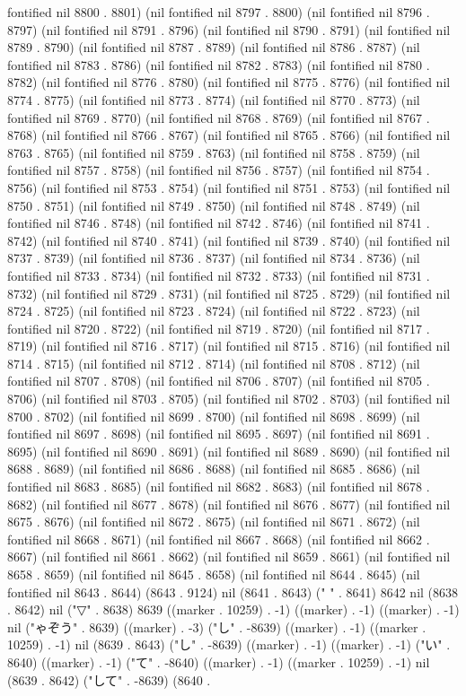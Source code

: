 {{fontified nil 8800 . 8801) (nil fontified nil 8797 . 8800) (nil fontified nil 8796 . 8797) (nil fontified nil 8791 . 8796) (nil fontified nil 8790 . 8791) (nil fontified nil 8789 . 8790) (nil fontified nil 8787 . 8789) (nil fontified nil 8786 . 8787) (nil fontified nil 8783 . 8786) (nil fontified nil 8782 . 8783) (nil fontified nil 8780 . 8782) (nil fontified nil 8776 . 8780) (nil fontified nil 8775 . 8776) (nil fontified nil 8774 . 8775) (nil fontified nil 8773 . 8774) (nil fontified nil 8770 . 8773) (nil fontified nil 8769 . 8770) (nil fontified nil 8768 . 8769) (nil fontified nil 8767 . 8768) (nil fontified nil 8766 . 8767) (nil fontified nil 8765 . 8766) (nil fontified nil 8763 . 8765) (nil fontified nil 8759 . 8763) (nil fontified nil 8758 . 8759) (nil fontified nil 8757 . 8758) (nil fontified nil 8756 . 8757) (nil fontified nil 8754 . 8756) (nil fontified nil 8753 . 8754) (nil fontified nil 8751 . 8753) (nil fontified nil 8750 . 8751) (nil fontified nil 8749 . 8750) (nil fontified nil 8748 . 8749) (nil fontified nil 8746 . 8748) (nil fontified nil 8742 . 8746) (nil fontified nil 8741 . 8742) (nil fontified nil 8740 . 8741) (nil fontified nil 8739 . 8740) (nil fontified nil 8737 . 8739) (nil fontified nil 8736 . 8737) (nil fontified nil 8734 . 8736) (nil fontified nil 8733 . 8734) (nil fontified nil 8732 . 8733) (nil fontified nil 8731 . 8732) (nil fontified nil 8729 . 8731) (nil fontified nil 8725 . 8729) (nil fontified nil 8724 . 8725) (nil fontified nil 8723 . 8724) (nil fontified nil 8722 . 8723) (nil fontified nil 8720 . 8722) (nil fontified nil 8719 . 8720) (nil fontified nil 8717 . 8719) (nil fontified nil 8716 . 8717) (nil fontified nil 8715 . 8716) (nil fontified nil 8714 . 8715) (nil fontified nil 8712 . 8714) (nil fontified nil 8708 . 8712) (nil fontified nil 8707 . 8708) (nil fontified nil 8706 . 8707) (nil fontified nil 8705 . 8706) (nil fontified nil 8703 . 8705) (nil fontified nil 8702 . 8703) (nil fontified nil 8700 . 8702) (nil fontified nil 8699 . 8700) (nil fontified nil 8698 . 8699) (nil fontified nil 8697 . 8698) (nil fontified nil 8695 . 8697) (nil fontified nil 8691 . 8695) (nil fontified nil 8690 . 8691) (nil fontified nil 8689 . 8690) (nil fontified nil 8688 . 8689) (nil fontified nil 8686 . 8688) (nil fontified nil 8685 . 8686) (nil fontified nil 8683 . 8685) (nil fontified nil 8682 . 8683) (nil fontified nil 8678 . 8682) (nil fontified nil 8677 . 8678) (nil fontified nil 8676 . 8677) (nil fontified nil 8675 . 8676) (nil fontified nil 8672 . 8675) (nil fontified nil 8671 . 8672) (nil fontified nil 8668 . 8671) (nil fontified nil 8667 . 8668) (nil fontified nil 8662 . 8667) (nil fontified nil 8661 . 8662) (nil fontified nil 8659 . 8661) (nil fontified nil 8658 . 8659) (nil fontified nil 8645 . 8658) (nil fontified nil 8644 . 8645) (nil fontified nil 8643 . 8644) (8643 . 9124) nil (8641 . 8643) (" " . 8641) 8642 nil (8638 . 8642) nil ("▽" . 8638) 8639 ((marker . 10259) . -1) ((marker) . -1) ((marker) . -1) nil ("ゃぞう" . 8639) ((marker) . -3) ("し" . -8639) ((marker) . -1) ((marker . 10259) . -1) nil (8639 . 8643) ("し" . -8639) ((marker) . -1) ((marker) . -1) ("い" . 8640) ((marker) . -1) ("て" . -8640) ((marker) . -1) ((marker . 10259) . -1) nil (8639 . 8642) ("して" . -8639) (8640 . }}
